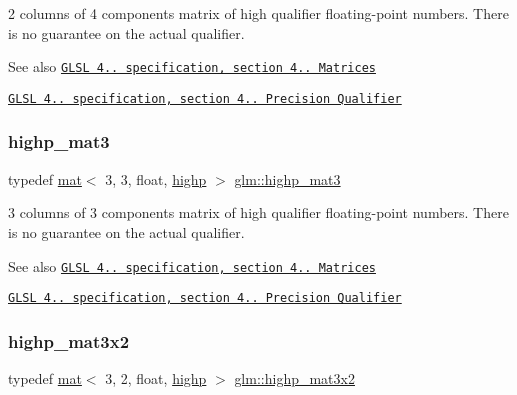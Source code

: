 2 columns of 4 components matrix of high qualifier floating-\/point numbers. There is no guarantee on the actual qualifier.

\begin{DoxySeeAlso}{See also}
\href{http://www.opengl.org/registry/doc/GLSLangSpec.4.20.8.pdf}{\tt G\+L\+SL 4.. specification, section 4.. Matrices} 

\href{http://www.opengl.org/registry/doc/GLSLangSpec.4.20.8.pdf}{\tt G\+L\+SL 4.. specification, section 4.. Precision Qualifier} 
\end{DoxySeeAlso}
\mbox{\label{group__core__precision_gaa1178bd043ab93d1207bda8d06cd078c}} 
\subsubsection{\texorpdfstring{highp\+\_\+mat3}{highp\_mat3}}
{\footnotesize\ttfamily typedef \mbox{\hyperlink{structglm_1_1mat}{mat}}$<$ 3, 3, float, \mbox{\hyperlink{namespaceglm_a36ed105b07c7746804d7fdc7cc90ff25ac6f7eab42eacbb10d59a58e95e362074}{highp}} $>$ \mbox{\hyperlink{group__core__precision_gaa1178bd043ab93d1207bda8d06cd078c}{glm\+::highp\+\_\+mat3}}}

3 columns of 3 components matrix of high qualifier floating-\/point numbers. There is no guarantee on the actual qualifier.

\begin{DoxySeeAlso}{See also}
\href{http://www.opengl.org/registry/doc/GLSLangSpec.4.20.8.pdf}{\tt G\+L\+SL 4.. specification, section 4.. Matrices} 

\href{http://www.opengl.org/registry/doc/GLSLangSpec.4.20.8.pdf}{\tt G\+L\+SL 4.. specification, section 4.. Precision Qualifier} 
\end{DoxySeeAlso}
\mbox{\label{group__core__precision_ga2188c0b772ac9d6210d46af34e04f375}} 
\subsubsection{\texorpdfstring{highp\+\_\+mat3x2}{highp\_mat3x2}}
{\footnotesize\ttfamily typedef \mbox{\hyperlink{structglm_1_1mat}{mat}}$<$ 3, 2, float, \mbox{\hyperlink{namespaceglm_a36ed105b07c7746804d7fdc7cc90ff25ac6f7eab42eacbb10d59a58e95e362074}{highp}} $>$ \mbox{\hyperlink{group__core__precision_ga2188c0b772ac9d6210d46af34e04f375}{glm\+::highp\+\_\+mat3x2}}}

